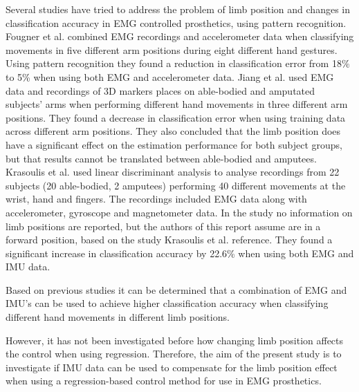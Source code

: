 Several studies have tried to address the problem of limb position and changes in classification accuracy in EMG controlled prosthetics, using pattern recognition. %
Fougner et al. combined EMG recordings and accelerometer data when classifying movements in five different arm positions during eight different hand gestures. Using pattern recognition they found a reduction in classification error from 18\% to 5\% when using both EMG and accelerometer data. \cite{Fougner2011} Jiang et al. used EMG data and recordings of 3D markers places on able-bodied and amputated subjects' arms when performing different hand movements in three different arm positions. They found a decrease in classification error when using training data across different arm positions. They also concluded that the limb position does have a significant effect on the estimation performance for both subject groups, but that results cannot be translated between able-bodied and amputees. \cite{Jiang2013} Krasoulis et al. used linear discriminant analysis to analyse recordings from 22 subjects (20 able-bodied, 2 amputees) performing 40 different movements at the wrist, hand and fingers. The recordings included EMG data along with accelerometer, gyroscope and magnetometer data. In the study \cite{Krasoulis2017} no information on limb positions are reported, but the authors of this report assume are in a forward position, based on the study Krasoulis et al. reference. They found a significant increase in classification accuracy by 22.6\% when using both EMG and IMU data. \cite{Krasoulis2017} 

Based on previous studies it can be determined that a combination of EMG and IMU's can be used to achieve higher classification accuracy when classifying different hand movements in different limb positions. 

However, it has not been investigated before how changing limb position affects the control when using regression. Therefore, the aim of the present study is to investigate if IMU data can be used to compensate for the limb position effect when using a regression-based control method for use in EMG prosthetics. 



